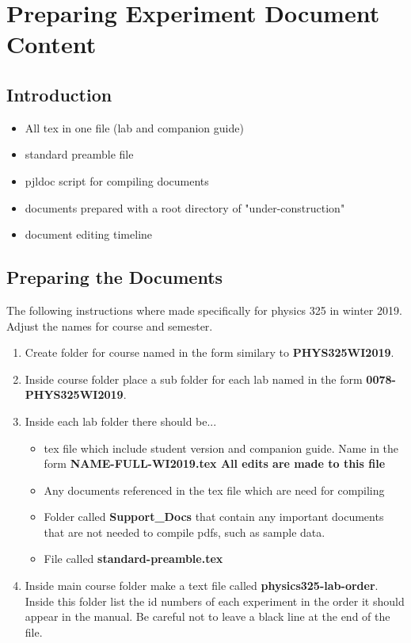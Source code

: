 \documentclass[justified]{LabArx3_5_1}
\begin{document}


\section{Preparing Experiment Document Content}

\subsection{Introduction}
\begin{itemize}
\item All tex in one file (lab and companion guide)
\item standard preamble file
\item pjldoc script for compiling documents
\item documents prepared with a root directory of "under-construction"
\item document editing timeline
\end{itemize}


\subsection{Preparing the Documents}\label{prepDocs}

The following instructions where made specifically for physics 325 in winter 2019. Adjust the names for course and semester.

\begin{enumerate}
\item Create folder for course named in the form similary to {\bf PHYS325WI2019}.

\item Inside course folder place a sub folder for each lab named in the form {\bf 0078-PHYS325WI2019}.

\item Inside each lab folder there should be...
	\begin{itemize}
	\item tex file which include student version and companion 	guide. Name in the form { \bf NAME-FULL-WI2019.tex All edits are made to this file}
	\item Any documents referenced in the tex file which are need for compiling
	\item Folder called {\bf Support\_Docs} that contain any important documents that are not needed to compile pdfs, such as sample data.
	\item File called {\bf standard-preamble.tex}
	
	\end{itemize}
\item Inside main course folder make a text file called {\bf physics325-lab-order}. Inside this folder list the id numbers of each experiment in the order it should appear in the manual. Be careful not to leave a black line at the end of the file.
\end{enumerate}
\end{document}
